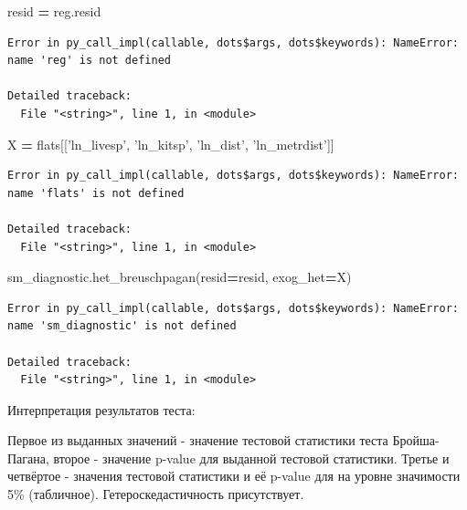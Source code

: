 \documentclass[]{book}
\newenvironment{Shaded}{\begin{snugshade}}{\end{snugshade}}
\newcommand{\NormalTok}[1]{#1}
\newcommand{\OperatorTok}[1]{\textcolor[rgb]{0.81,0.36,0.00}{\textbf{#1}}}
\newcommand{\StringTok}[1]{\textcolor[rgb]{0.31,0.60,0.02}{#1}}
\begin{document}
\begin{Shaded}
\begin{Highlighting}[]
\NormalTok{resid }\OperatorTok{=}\NormalTok{ reg.resid}
\end{Highlighting}
\end{Shaded}

\begin{verbatim}
Error in py_call_impl(callable, dots$args, dots$keywords): NameError: name 'reg' is not defined

Detailed traceback: 
  File "<string>", line 1, in <module>
\end{verbatim}

\begin{Shaded}
\begin{Highlighting}[]
\NormalTok{X }\OperatorTok{=}\NormalTok{ flats[[}\StringTok{'ln_livesp'}\NormalTok{, }\StringTok{'ln_kitsp'}\NormalTok{, }\StringTok{'ln_dist'}\NormalTok{, }\StringTok{'ln_metrdist'}\NormalTok{]]}
\end{Highlighting}
\end{Shaded}

\begin{verbatim}
Error in py_call_impl(callable, dots$args, dots$keywords): NameError: name 'flats' is not defined

Detailed traceback: 
  File "<string>", line 1, in <module>
\end{verbatim}

\begin{Shaded}
\begin{Highlighting}[]
\NormalTok{sm_diagnostic.het_breuschpagan(resid}\OperatorTok{=}\NormalTok{resid, exog_het}\OperatorTok{=}\NormalTok{X)}
\end{Highlighting}
\end{Shaded}

\begin{verbatim}
Error in py_call_impl(callable, dots$args, dots$keywords): NameError: name 'sm_diagnostic' is not defined

Detailed traceback: 
  File "<string>", line 1, in <module>
\end{verbatim}

Интерпретация результатов теста:

Первое из выданных значений - значение тестовой статистики теста Бройша-Пагана, второе - значение p-value для выданной тестовой статистики. Третье и четвёртое - значения тестовой статистики и её p-value для на уровне значимости 5\% (табличное). Гетероскедастичность присутствует.
\end{document}
